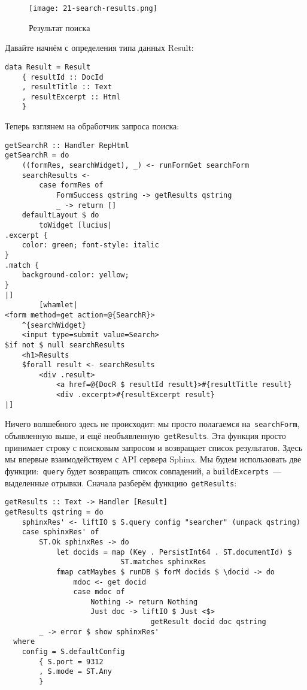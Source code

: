 \begin{figure}[hbt]
    \begin{center}
        \texttt{[image: 21-search-results.png]}
        \caption{Результат поиска}\label{Fig:search_results}
    \end{center}
\end{figure}

Давайте начнём с определения типа данных Result:
\begin{lstlisting}
data Result = Result
    { resultId :: DocId
    , resultTitle :: Text
    , resultExcerpt :: Html
    }
\end{lstlisting}

Теперь взглянем на обработчик запроса поиска: %
\begin{lstlisting}
getSearchR :: Handler RepHtml
getSearchR = do
    ((formRes, searchWidget), _) <- runFormGet searchForm
    searchResults <-
        case formRes of
            FormSuccess qstring -> getResults qstring
            _ -> return []
    defaultLayout $ do
        toWidget [lucius|
.excerpt {
    color: green; font-style: italic
}
.match {
    background-color: yellow;
}
|]
        [whamlet|
<form method=get action=@{SearchR}>
    ^{searchWidget}
    <input type=submit value=Search>
$if not $ null searchResults
    <h1>Results
    $forall result <- searchResults
        <div .result>
            <a href=@{DocR $ resultId result}>#{resultTitle result}
            <div .excerpt>#{resultExcerpt result}
|]
\end{lstlisting}%

Ничего волшебного здесь не происходит: мы просто полагаемся на~\lstinline'searchForm', объявленную выше, и ещё необъявленную~\lstinline'getResults'. Эта функция просто принимает строку с поисковым запросом и возвращает список результатов. Здесь мы впервые взаимодействуем с API сервера Sphinx. Мы будем использовать две функции:~\lstinline'query' будет возвращать список совпадений, а \lstinline'buildExcerpts'~--- выделенные отрывки. Сначала разберём функцию~\lstinline!getResults!:
\begin{lstlisting}
getResults :: Text -> Handler [Result]
getResults qstring = do
    sphinxRes' <- liftIO $ S.query config "searcher" (unpack qstring)
    case sphinxRes' of
        ST.Ok sphinxRes -> do
            let docids = map (Key . PersistInt64 . ST.documentId) $
                           ST.matches sphinxRes
            fmap catMaybes $ runDB $ forM docids $ \docid -> do
                mdoc <- get docid
                case mdoc of
                    Nothing -> return Nothing
                    Just doc -> liftIO $ Just <$>
                                  getResult docid doc qstring
        _ -> error $ show sphinxRes'
  where
    config = S.defaultConfig
        { S.port = 9312
        , S.mode = ST.Any
        }
\end{lstlisting}%

